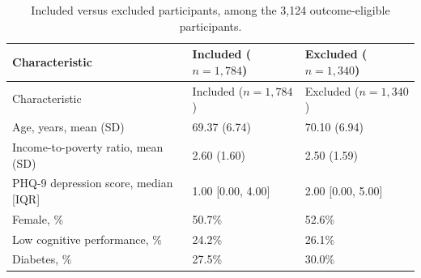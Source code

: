 \documentclass[12pt]{article}
\begin{document}
\pagestyle{empty}
\footnotesize
\setcounter{table}{1}
\begin{longtable}{p{6.0cm}R{3.5cm}R{3.5cm}}
\caption{Included versus excluded participants, among the 3,124 outcome-eligible participants.}
\label{tab:t1b}\\
\toprule
Characteristic & Included ($n=1{,}784$) & Excluded ($n=1{,}340$) \\
\midrule
\endfirsthead
\toprule
Characteristic & Included ($n=1{,}784$) & Excluded ($n=1{,}340$) \\
\midrule
\endhead
\bottomrule
\endlastfoot
Age, years, mean (SD) & 69.37 (6.74) & 70.10 (6.94) \\
Income-to-poverty ratio, mean (SD) & 2.60 (1.60) & 2.50 (1.59) \\
PHQ-9 depression score, median [IQR] & 1.00 [0.00, 4.00] & 2.00 [0.00, 5.00] \\
Female, \% & 50.7\% & 52.6\% \\
Low cognitive performance, \% & 24.2\% & 26.1\% \\
Diabetes, \% & 27.5\% & 30.0\% \\
\end{longtable}
\end{document}
